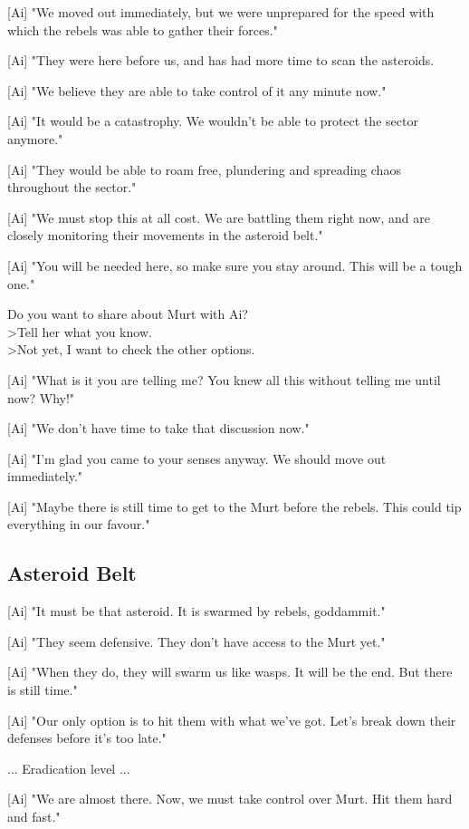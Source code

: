 \documentclass[a4paper,12pt]{article}
\begin{document}
[Ai] "We moved out immediately, but we were unprepared for the speed with which the rebels was able to gather their forces."

[Ai] "They were here before us, and has had more time to scan the asteroids. 

[Ai] "We believe they are able to take control of it any minute now."

[Ai] "It would be a catastrophy. We wouldn't be able to protect the sector anymore." 

[Ai] "They would be able to roam free, plundering and spreading chaos throughout the sector."

[Ai] "We must stop this at all cost. We are battling them right now, and are closely monitoring their movements in
the asteroid belt."

[Ai] "You will be needed here, so make sure you stay around. This will be a tough one."

Do you want to share about Murt with Ai?\\
\textgreater Tell her what you know.\\
\textgreater Not yet, I want to check the other options.

[Ai] "What is it you are telling me? You knew all this without telling me until now? Why!"

[Ai] "We don't have time to take that discussion now." 

[Ai] "I'm glad you came to your senses anyway. We should move out immediately."

[Ai] "Maybe there is still time to get to the Murt before the rebels. This could tip everything in our favour."

\subsection{Asteroid Belt}

[Ai] "It must be that asteroid. It is swarmed by rebels, goddammit."

[Ai] "They seem defensive. They don't have access to the Murt yet." 

[Ai] "When they do, they will swarm us like wasps. It will be the end. But there is still time."

[Ai] "Our only option is to hit them with what we've got. Let's break down their defenses before it's too late."

... Eradication level ...

[Ai] "We are almost there. Now, we must take control over Murt. Hit them hard and fast."
\end{document}
